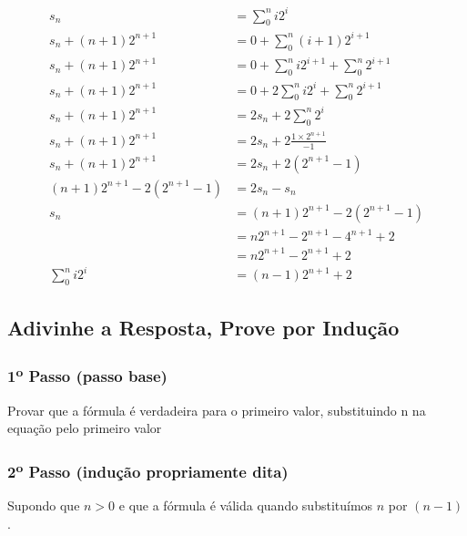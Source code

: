 \documentclass{article}
\begin{document}
\begin{equation}
    \begin{aligned}
     s_n &= \sum_0^n i2^i \\
     s_n + (n+1)2^{n+1} &= 0 + \sum_0^n (i+1)2^{i+1} \\
     s_n + (n+1)2^{n+1} &= 0 + \sum_0^n i2^{i+1} + \sum_0^n 2^{i+1} \\
     s_n + (n+1)2^{n+1} &= 0 + 2\sum_0^n i2^{i} + \sum_0^n 2^{i+1} \\
     s_n + (n+1)2^{n+1} &= 2s_n + 2\sum_0^n 2^{i} \\
     s_n + (n+1)2^{n+1} &= 2s_n + 2\frac{1\times2^{n+1}}{-1} \\
     s_n + (n+1)2^{n+1} &= 2s_n + 2(2^{n+1}-1) \\
     (n+1)2^{n+1} - 2(2^{n+1}-1) &= 2s_n - s_n \\
     s_n &= (n+1)2^{n+1} - 2(2^{n+1}-1) \\
        &= n2^{n+1} - 2^{n+1} - 4^{n+1} + 2 \\
        &= n2^{n+1} - 2^{n+1} + 2 \\
    \sum_0^n i2^i &= (n - 1)2^{n+1} + 2
    \end{aligned}
\end{equation}

\subsection{Adivinhe a Resposta, Prove por Indução}
\subsubsection{1\textsuperscript{o} Passo (passo base)}
Provar que a fórmula é verdadeira para o primeiro
valor, substituindo n na equação pelo primeiro valor
\subsubsection{2\textsuperscript{o} Passo (indução propriamente dita)}
Supondo que $n > 0$ e que a fórmula é válida quando substituímos $n$ por $(n-1)$.
\end{document}
